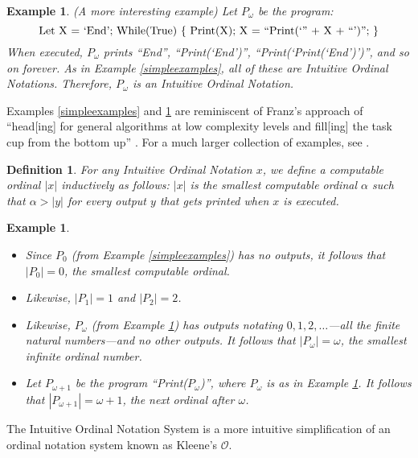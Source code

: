 \documentclass[runningheads]{llncs}
\newtheorem{myexample}[mytheorem]{Example}
\newtheorem{mydefinition}[mytheorem]{Definition}
\begin{document}
\begin{myexample}
\label{omegaexample}
(A more interesting example)
    Let $P_\omega$ be the program:
    \[
        \mbox{\normalfont Let X = `End';
        While(True) \{ Print(X); X = ``Print(`'' + X + ``')''; \}}
    \]
    When executed, $P_\omega$ prints ``End'', ``Print(`End')'',
    ``Print(`Print(`End')')'', and so on forever. As
    in Example \ref{simpleexamples}, all of these are Intuitive Ordinal Notations.
    Therefore, $P_\omega$ is an Intuitive Ordinal Notation.
\end{myexample}

Examples \ref{simpleexamples} and \ref{omegaexample} are reminiscent
of Franz's approach of ``head[ing] for general algorithms at low complexity levels
and fill[ing] the task cup from the bottom up'' \cite{franz2015toward}.
For a much larger collection of examples, see \cite{github}.

\begin{mydefinition}
    For any Intuitive Ordinal Notation $x$, we define a computable ordinal $|x|$
    inductively as follows: $|x|$ is the smallest computable ordinal $\alpha$
    such that $\alpha>|y|$ for every output $y$ that gets printed when $x$ is
    executed.
\end{mydefinition}

\begin{myexample}
    \begin{itemize}
        \item
        Since $P_0$ (from Example \ref{simpleexamples}) has no outputs,
        it follows that $|P_0|=0$, the smallest computable ordinal.
        \item
        Likewise, $|P_1|=1$ and $|P_2|=2$.
        \item
        Likewise, $P_\omega$ (from Example \ref{omegaexample}) has outputs
        notating $0, 1, 2, \ldots$---all the finite natural numbers---and no
        other outputs. It follows that $|P_\omega|=\omega$, the smallest
        infinite ordinal number.
        \item
        Let $P_{\omega+1}$ be the program ``Print($P_\omega$)'',
        where $P_\omega$ is as in Example \ref{omegaexample}.
        It follows that $|P_{\omega+1}|=\omega+1$, the next ordinal after
        $\omega$.
    \end{itemize}
\end{myexample}

The Intuitive Ordinal Notation System is a more intuitive simplification of
an ordinal notation system known as Kleene's $\mathcal O$.
\end{document}
